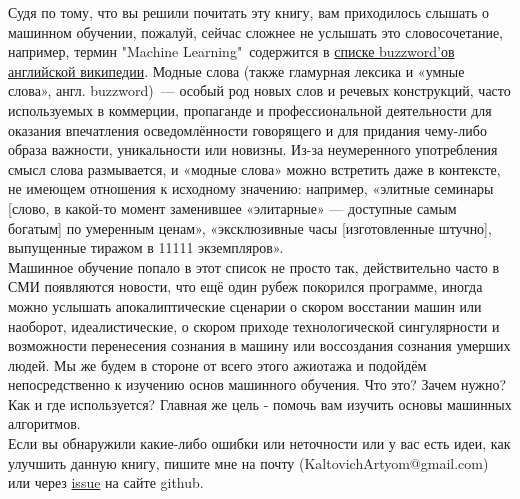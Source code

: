 Судя по тому, что вы решили почитать эту книгу, вам приходилось слышать о машинном обучении, пожалуй, сейчас сложнее не услышать это словосочетание, например, термин "Machine Learning"\ содержится в \href{https://en.wikipedia.org/wiki/List_of_buzzwords}{списке buzzword'ов английской википедии}.
Модные слова (также гламурная лексика и «умные слова», англ. buzzword)~— особый род новых слов и речевых конструкций, часто используемых в коммерции, пропаганде и профессиональной деятельности для оказания впечатления осведомлённости говорящего и для придания чему-либо образа важности, уникальности или новизны. Из-за неумеренного употребления смысл слова размывается, и «модные слова» можно встретить даже в контексте, не имеющем отношения к исходному значению: например, «элитные семинары [слово, в какой-то момент заменившее «элитарные» — доступные самым богатым] по умеренным ценам», «эксклюзивные часы [изготовленные штучно], выпущенные тиражом в 11111 экземпляров». \cite{wiki:buzzword_def}\\

Машинное обучение попало в этот список не просто так, действительно часто в СМИ появляются новости, что ещё один рубеж покорился программе, иногда можно услышать апокалиптические сценарии о скором восстании машин или наоборот, идеалистические, о скором приходе технологической сингулярности и возможности перенесения сознания в машину или воссоздания сознания умерших людей. Мы же будем в стороне от всего этого ажиотажа и подойдём непосредственно к изучению основ машинного обучения. Что это? Зачем нужно? Как и где используется? Главная же цель \-- помочь вам изучить основы машинных алгоритмов.\\

Если вы обнаружили какие-либо ошибки или неточности или у вас есть идеи, как улучшить данную книгу, пишите мне на почту (KaltovichArtyom@gmail.com) или через \href{https://github.com/ArtyomKaltovich/ml-cource/issues}{issue} на сайте github.

